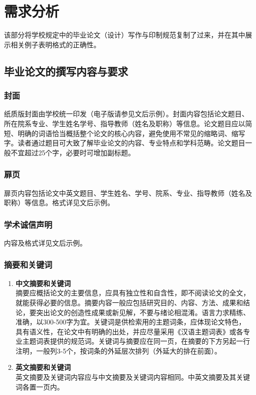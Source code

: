 \chapter{需求分析}

\label{cha:sysu-thesis-contents-format-requirement}


该部分将学校规定中的毕业论文（设计）写作与印制规范复制了过来，并在其中展示相关例子表明格式的正确性。


\section{毕业论文的撰写内容与要求}

\subsection{封面}


纸质版封面由学校统一印发（电子版请参见文后示例）。封面内容包括论文题目、所在院系专业、学生姓名学号、指导教师（姓名及职称）等信息。论文题目应以简短、明确的词语恰当概括整个论文的核心内容，避免使用不常见的缩略词、缩写字。读者通过题目可大致了解毕业论文的内容、专业特点和学科范畴。论文题目一般不宜超过25个字，必要时可增加副标题。

\subsection{扉页}

扉页内容包括论文中英文题目、学生姓名、学号、院系、专业、指导教师（姓名及职称）等信息。格式详见文后示例。

\subsection{学术诚信声明}

内容及格式详见文后示例。

\subsection{摘要和关键词}

\begin{enumerate}
    \item \textbf{中文摘要和关键词} \\
          摘要应概括论文的主要信息，应具有独立性和自含性，即不阅读论文的全文，就能获得必要的信息。摘要内容一般应包括研究目的、内容、方法、成果和结论，要突出论文的创造性成果或新见解，不要与绪论相混淆。语言力求精练、准确，以300-500字为宜。关键词是供检索用的主题词条，应体现论文特色，具有语义性，在论文中有明确的出处，并应尽量采用《汉语主题词表》或各专业主题词表提供的规范词。关键词与摘要应在同一页，在摘要的下方另起一行注明，一般列3-5个，按词条的外延层次排列（外延大的排在前面）。
    \item \textbf{英文摘要和关键词} \\
          英文摘要及关键词内容应与中文摘要及关键词内容相同。中英文摘要及其关键词各置一页内。
\end{enumerate}

